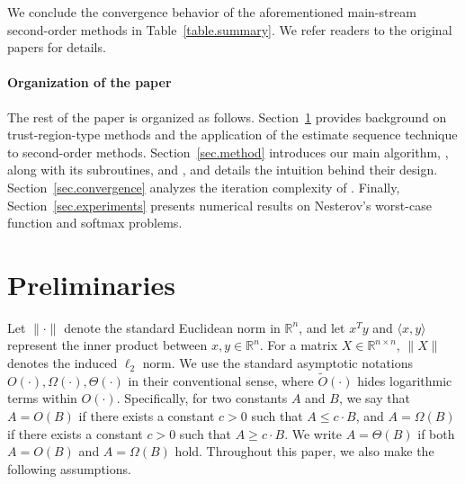 \documentclass{article}
\theoremstyle{plain}
\theoremstyle{definition}
\newtheorem{assumption}[theorem]{Assumption}
\theoremstyle{remark}
\newcommand{\cz}[1]{{\color{rr} #1}}
\begin{document}
We conclude the convergence behavior of the aforementioned main-stream second-order methods in Table~\ref{table.summary}. We refer readers to the original papers for details.

\paragraph{Organization of the paper}
The rest of the paper is organized as follows. Section~\ref{sec.priliminary} provides background on trust-region-type methods and the application of the estimate sequence technique to second-order methods. Section~\ref{sec.method} introduces our main algorithm, , along with its subroutines,  and , and details the intuition behind their design. Section~\ref{sec.convergence} analyzes the iteration complexity of . Finally, Section~\ref{sec.experiments} presents numerical results on Nesterov’s worst-case function and softmax problems.

\section{Preliminaries}
\label{sec.priliminary}
Let $\|\cdot\|$ denote the standard Euclidean norm in $\mathbb{R}^n$, and let $x^T y$ and $\langle x,y\rangle$ represent the inner product between $x, y \in \mathbb{R}^n$. For a matrix $X \in \mathbb{R}^{n \times n}$, $\|X\|$ denotes the induced $\ell_2$ norm. We use the standard asymptotic notations $O(\cdot), \Omega(\cdot), \Theta(\cdot)$ in their conventional sense, where $\tilde{O}(\cdot)$ hides logarithmic terms within $O(\cdot)$. Specifically, for two constants $A$ and $B$, we say that $A = O(B)$ if there exists a constant $c > 0$ such that $A \leq c \cdot B$, and $A = \Omega(B)$ if there exists a constant $c > 0$ such that $A \geq c \cdot B$. We write $A = \Theta(B)$ if both $A = O(B)$ and $A = \Omega(B)$ hold.
Throughout this paper, we also make the following assumptions.


\end{document}
